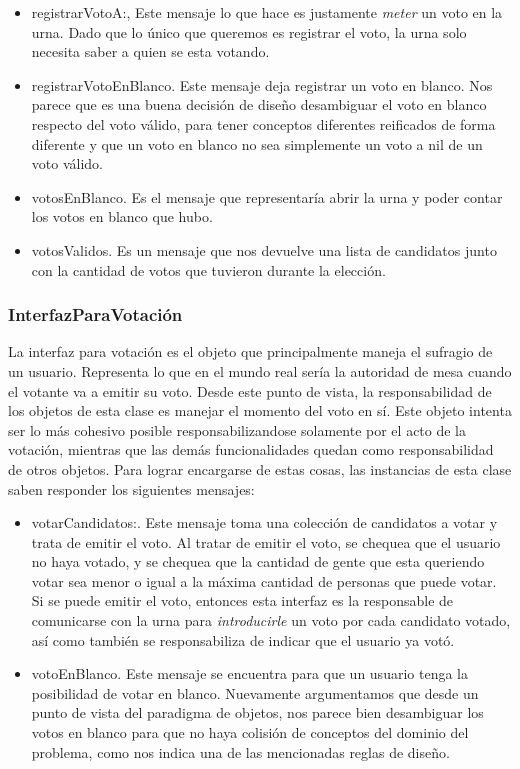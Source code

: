 \begin{itemize} 
\item registrarVotoA:, Este mensaje lo que hace es justamente \emph{meter} un voto en la urna. Dado que lo \'unico que queremos es registrar el voto, la urna solo necesita saber a quien se esta votando.
\item registrarVotoEnBlanco. Este mensaje deja registrar un voto en blanco. Nos parece que es una buena decisi\'on de diseño desambiguar el voto en blanco respecto del voto v\'alido, para tener conceptos diferentes reificados de forma diferente y que un voto en blanco no sea simplemente un voto a nil de un voto v\'alido.
\item votosEnBlanco. Es el mensaje que representar\'ia abrir la urna y poder contar los votos en blanco que hubo.
\item votosValidos. Es un mensaje que nos devuelve una lista de candidatos junto con la cantidad de votos que tuvieron durante la elecci\'on.
\end{itemize}


\subsubsection{InterfazParaVotaci\'on}

La interfaz para votaci\'on es el objeto que principalmente maneja el sufragio de un usuario. Representa lo que en el mundo real ser\'ia la autoridad de mesa cuando el votante va a emitir su voto. Desde este punto de vista, la responsabilidad de los objetos de esta clase es manejar el momento del voto en s\'i. Este objeto intenta ser lo m\'as cohesivo posible responsabilizandose solamente por el acto de la votaci\'on, mientras que las dem\'as funcionalidades quedan como responsabilidad de otros objetos. Para lograr encargarse de estas cosas, las instancias de esta clase saben responder los siguientes mensajes:

\begin{itemize}
\item votarCandidatos:. Este mensaje toma una colecci\'on de candidatos a votar y trata de emitir el voto. Al tratar de emitir el voto, se chequea que el usuario no haya votado, y se chequea que la cantidad de gente que esta queriendo votar sea menor o igual a la m\'axima cantidad de personas que puede votar. Si se puede emitir el voto, entonces esta interfaz es la responsable de comunicarse con la urna para \emph{introducirle} un voto por cada candidato votado, as\'i como tambi\'en se responsabiliza de indicar que el usuario ya vot\'o.
\item votoEnBlanco. Este mensaje se encuentra para que un usuario tenga la posibilidad de votar en blanco. Nuevamente argumentamos que desde un punto de vista del paradigma de objetos, nos parece bien desambiguar los votos en blanco para que no haya colisi\'on de conceptos del dominio del problema, como nos indica una de las mencionadas reglas de dise\~{n}o.
\end{itemize}




